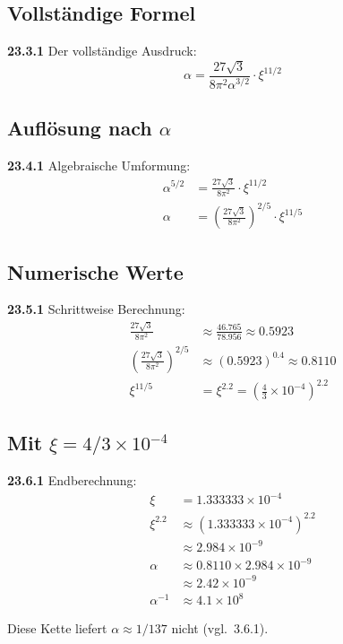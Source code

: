 \subsection{Vollständige Formel}
\noindent \textbf{23.3.1} Der vollständige Ausdruck:
\begin{equation}
	\alpha = \frac{27\sqrt{3}}{8\pi^2\alpha^{3/2}} \cdot \xi^{11/2}
\end{equation}

\subsection{Auflösung nach $\alpha$}
\noindent \textbf{23.4.1} Algebraische Umformung:
\begin{align}
	\alpha^{5/2} &= \frac{27\sqrt{3}}{8\pi^2} \cdot \xi^{11/2} \\
	\alpha &= \left(\frac{27\sqrt{3}}{8\pi^2}\right)^{2/5} \cdot \xi^{11/5}
\end{align}

\subsection{Numerische Werte}
\noindent \textbf{23.5.1} Schrittweise Berechnung:
\begin{align}
	\frac{27\sqrt{3}}{8\pi^2} &\approx \frac{46.765}{78.956} \approx 0.5923 \\
	\left(\frac{27\sqrt{3}}{8\pi^2}\right)^{2/5} &\approx (0.5923)^{0.4} \approx 0.8110 \\
	\xi^{11/5} &= \xi^{2.2} = \left(\frac{4}{3} \times 10^{-4}\right)^{2.2}
\end{align}

\subsection{Mit $\xi = 4/3 \times 10^{-4}$}
\noindent \textbf{23.6.1} Endberechnung:
\begin{align}
	\xi &= 1.333333 \times 10^{-4} \\
	\xi^{2.2} &\approx (1.333333 \times 10^{-4})^{2.2} \\
	&\approx 2.984 \times 10^{-9} \\
	\alpha &\approx 0.8110 \times 2.984 \times 10^{-9} \\
	&\approx 2.42 \times 10^{-9} \\
	\alpha^{-1} &\approx 4.1 \times 10^{8}
\end{align}

Diese Kette liefert $\alpha \approx 1/137$ nicht (vgl.\ 3.6.1).

